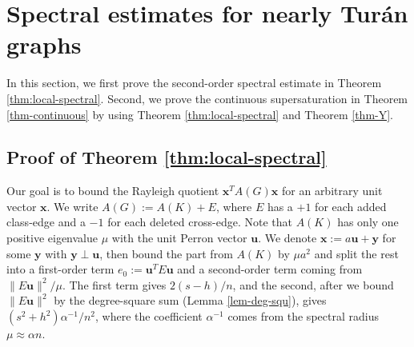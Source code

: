 \documentclass[11pt,a4paper]{article}
\theoremstyle{definition}
\theoremstyle{plain}
\begin{document}
\section{Spectral estimates for nearly Tur\'{a}n graphs}

\label{sec-1-8-and-1-7}

In this section, we first prove the second-order  spectral estimate in Theorem \ref{thm:local-spectral}. Second, we prove the continuous supersaturation in Theorem \ref{thm-continuous} by using Theorem \ref{thm:local-spectral} and Theorem \ref{thm-Y}. 


\subsection{Proof of Theorem \ref{thm:local-spectral}}

Our goal is to bound the Rayleigh quotient $\bm{x}^TA(G)\bm{x}$ for an arbitrary unit vector $\bm{x}$. 
We write $A(G):=A(K)+E$, where $E$ has a $+1$ for each added class-edge and a
$-1$ for each deleted cross-edge.  
 Note that $A(K)$ has only one positive eigenvalue $\mu$ with the unit Perron vector $\bm{u}$.  
We denote  
$\bm{x}:=a\bm u+\bm y$ for some $\bm{y}$ with $\bm y\perp\bm u$, then bound the part from $A(K)$ by $\mu a^2$ and split the rest into a first-order term $e_0:=\bm u^TE\bm u$ and a second-order term coming from
$\|E\bm u\|^2/\mu$. The first term gives $2(s-h)/n$, and the second, after we bound $\|E\bm u\|^2$
by the degree-square sum (Lemma \ref{lem-deg-squ}), gives $(s^2+h^2)\alpha^{-1}/n^2$, where the
coefficient $\alpha^{-1}$ comes from the spectral radius $\mu\approx\alpha n$. 
\end{document}
